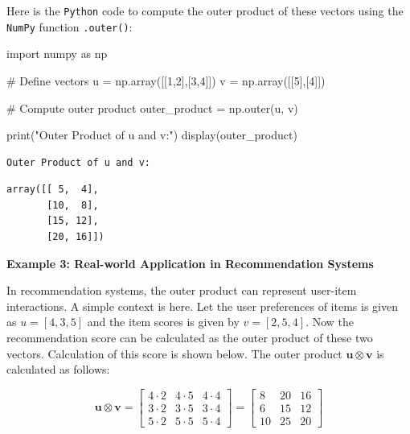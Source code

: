 \documentclass[
  letterpaper,
  DIV=11,
  numbers=noendperiod]{scrreprt}
\newenvironment{Shaded}{\begin{snugshade}}{\end{snugshade}}
\newcommand{\BuiltInTok}[1]{\textcolor[rgb]{0.00,0.23,0.31}{#1}}
\newcommand{\CommentTok}[1]{\textcolor[rgb]{0.37,0.37,0.37}{#1}}
\newcommand{\DecValTok}[1]{\textcolor[rgb]{0.68,0.00,0.00}{#1}}
\newcommand{\ImportTok}[1]{\textcolor[rgb]{0.00,0.46,0.62}{#1}}
\newcommand{\NormalTok}[1]{\textcolor[rgb]{0.00,0.23,0.31}{#1}}
\newcommand{\OperatorTok}[1]{\textcolor[rgb]{0.37,0.37,0.37}{#1}}
\newcommand{\StringTok}[1]{\textcolor[rgb]{0.13,0.47,0.30}{#1}}
\theoremstyle{plain}
\theoremstyle{definition}
\theoremstyle{remark}
\begin{document}
Here is the \texttt{Python} code to compute the outer product of these
vectors using the \texttt{NumPy} function \texttt{.outer()}:

\begin{Shaded}
\begin{Highlighting}[]
\ImportTok{import}\NormalTok{ numpy }\ImportTok{as}\NormalTok{ np}

\CommentTok{\# Define vectors}
\NormalTok{u }\OperatorTok{=}\NormalTok{ np.array([[}\DecValTok{1}\NormalTok{,}\DecValTok{2}\NormalTok{],[}\DecValTok{3}\NormalTok{,}\DecValTok{4}\NormalTok{]])}
\NormalTok{v }\OperatorTok{=}\NormalTok{ np.array([[}\DecValTok{5}\NormalTok{],[}\DecValTok{4}\NormalTok{]])}

\CommentTok{\# Compute outer product}
\NormalTok{outer\_product }\OperatorTok{=}\NormalTok{ np.outer(u, v)}

\BuiltInTok{print}\NormalTok{(}\StringTok{"Outer Product of u and v:"}\NormalTok{)}
\NormalTok{display(outer\_product)}
\end{Highlighting}
\end{Shaded}

\begin{verbatim}
Outer Product of u and v:
\end{verbatim}

\begin{verbatim}
array([[ 5,  4],
       [10,  8],
       [15, 12],
       [20, 16]])
\end{verbatim}

\textbf{Example 3: Real-world Application in Recommendation Systems}

In recommendation systems, the outer product can represent user-item
interactions. A simple context is here. Let the user preferences of
items is given as \(u=[4, 3, 5]\) and the item scores is given by
\(v=[2, 5, 4]\). Now the recommendation score can be calculated as the
outer product of these two vectors. Calculation of this score is shown
below. The outer product \(\mathbf{u} \otimes \mathbf{v}\) is calculated
as follows:

\[\mathbf{u} \otimes \mathbf{v} = \begin{bmatrix}4 \cdot 2 & 4 \cdot 5 & 4 \cdot 4 \\3 \cdot 2 & 3 \cdot 5 & 3 \cdot 4 \\5 \cdot 2 & 5 \cdot 5 & 5 \cdot 4\end{bmatrix}= \begin{bmatrix}8 & 20 & 16 \\6 & 15 & 12 \\10 & 25 & 20\end{bmatrix}\]
\end{document}
